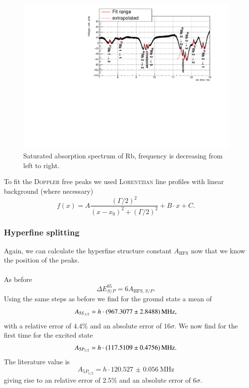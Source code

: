 \documentclass[11pt,a4paper,notitlepage]{scrartcl}
\begin{document}
\begin{figure}[H]
	\centering
	\includegraphics[width=\linewidth]{figs/measurements/nonlinear.pdf}
	\caption{Saturated absorption spectrum of Rb, frequency is decreasing from left to right.}
	\label{fig:nonlinearfit}
\end{figure}

To fit the \textsc{Doppler} free peaks we used \textsc{Lorentzian} line profiles with linear background (where necessary) $$f(x)=A\frac{(\Gamma/2)^2}{(x-x_0)^2+(\Gamma/2)^2}+B\cdot x + C.$$

\subsubsection{Hyperfine splitting}
Again, we can calculate the hyperfine structure constant $A_\text{HFS}$ now that we know the position of the peaks.
\paragraph{}
As before $$\Delta E_{S/P} ^{85}=6A_{\text{HFS},S/P}.$$
Using the same steps as before we find for the ground state a mean of $$A_{5S_{1/2}}=h\cdot\SI{967.3077\pm2.8488}{\mega\Hz},$$ with a relative error of $4.4\%$ and an absolute error of $16\sigma$. 
We now find for the first time for the excited state 
$$A_{5P_{1/2}}=h\cdot\SI{117.5109\pm0.4756}{\mega\Hz}.$$
The literature value is \cite{85d} $$A_{5P_{1/2}}=h\cdot\SI{120.527(56)}{\mega\Hz}$$
giving rise to an relative error of $2.5\%$ and an absolute error of $6\sigma$.
\end{document}
